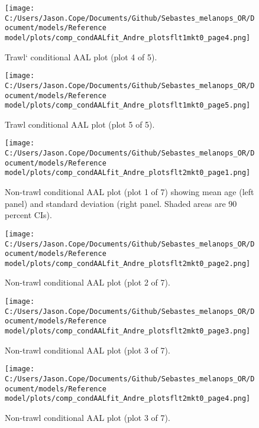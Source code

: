 \documentclass[11pt,
  english,
  letterpaper,
]{article}
\begin{document}
\begin{figure}
\centering
\texttt{[image: C:/Users/Jason.Cope/Documents/Github/Sebastes\_melanops\_OR/Document/models/Reference model/plots/comp\_condAALfit\_Andre\_plotsflt1mkt0\_page4.png]}
\caption{Trawl` conditional AAL plot (plot 4 of 5).\label{fig:comp_condAALfit_Andre_plotsflt1mkt0_page4}}
\end{figure}

\begin{figure}
\centering
\texttt{[image: C:/Users/Jason.Cope/Documents/Github/Sebastes\_melanops\_OR/Document/models/Reference model/plots/comp\_condAALfit\_Andre\_plotsflt1mkt0\_page5.png]}
\caption{Trawl conditional AAL plot (plot 5 of 5).\label{fig:comp_condAALfit_Andre_plotsflt1mkt0_page5}}
\end{figure}

\begin{figure}
\centering
\texttt{[image: C:/Users/Jason.Cope/Documents/Github/Sebastes\_melanops\_OR/Document/models/Reference model/plots/comp\_condAALfit\_Andre\_plotsflt2mkt0\_page1.png]}
\caption{Non-trawl conditional AAL plot (plot 1 of 7) showing mean age (left panel) and standard deviation (right panel. Shaded areas are 90 percent CIs).\label{fig:comp_condAALfit_Andre_plotsflt2mkt0_page1}}
\end{figure}

\begin{figure}
\centering
\texttt{[image: C:/Users/Jason.Cope/Documents/Github/Sebastes\_melanops\_OR/Document/models/Reference model/plots/comp\_condAALfit\_Andre\_plotsflt2mkt0\_page2.png]}
\caption{Non-trawl conditional AAL plot (plot 2 of 7).\label{fig:comp_condAALfit_Andre_plotsflt2mkt0_page2}}
\end{figure}

\begin{figure}
\centering
\texttt{[image: C:/Users/Jason.Cope/Documents/Github/Sebastes\_melanops\_OR/Document/models/Reference model/plots/comp\_condAALfit\_Andre\_plotsflt2mkt0\_page3.png]}
\caption{Non-trawl conditional AAL plot (plot 3 of 7).\label{fig:comp_condAALfit_Andre_plotsflt2mkt0_page3}}
\end{figure}

\begin{figure}
\centering
\texttt{[image: C:/Users/Jason.Cope/Documents/Github/Sebastes\_melanops\_OR/Document/models/Reference model/plots/comp\_condAALfit\_Andre\_plotsflt2mkt0\_page4.png]}
\caption{Non-trawl conditional AAL plot (plot 3 of 7).\label{fig:comp_condAALfit_Andre_plotsflt2mkt0_page4}}
\end{figure}
\end{document}
